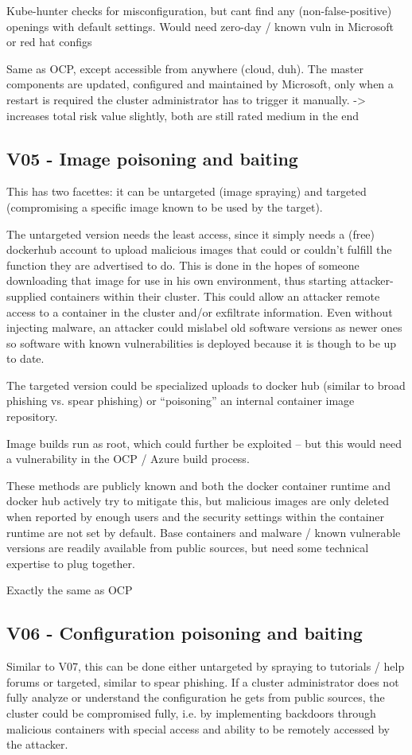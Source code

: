 Kube-hunter checks for misconfiguration, but cant find any (non-false-positive) openings with default settings. Would need zero-day / known vuln in Microsoft or red hat configs

Same as OCP, except accessible from anywhere (cloud, duh).
The master components are updated, configured and maintained by Microsoft, only when a restart is required the cluster administrator has to trigger it manually.
-> increases total risk value slightly, both are still rated medium in the end

\subsection{V05 - Image poisoning and baiting}
This has two facettes: it can be untargeted (image spraying) and targeted (compromising a specific image known to be used by the target).

The untargeted version needs the least access, since it simply needs a (free) dockerhub account to upload malicious images that could or couldn't fulfill the function they are advertised to do. This is done in the hopes of someone downloading that image for use in his own environment, thus starting attacker-supplied containers within their cluster.
This could allow an attacker remote access to a container in the cluster and/or exfiltrate information.
Even without injecting malware, an attacker could mislabel old software versions as newer ones so software with known vulnerabilities is deployed because it is though to be up to date.

The targeted version could be specialized uploads to docker hub (similar to broad phishing vs. spear phishing) or “poisoning” an internal container image repository.

Image builds run as root, which could further be exploited – but this would need a vulnerability in the OCP / Azure build process.

These methods are publicly known and both the docker container runtime and docker hub actively try to mitigate this, but malicious images are only deleted when reported by enough users and the security settings within the container runtime are not set by default.
Base containers and malware / known vulnerable versions are readily available from public sources, but need some technical expertise to plug together.

Exactly the same as OCP

\subsection{V06 - Configuration poisoning and baiting}
Similar to V07, this can be done either untargeted by spraying to tutorials / help forums or targeted, similar to spear phishing.
If a cluster administrator does not fully analyze or understand the configuration he gets from public sources, the cluster could be compromised fully, i.e. by implementing backdoors through malicious containers with special access and ability to be remotely accessed by the attacker.

